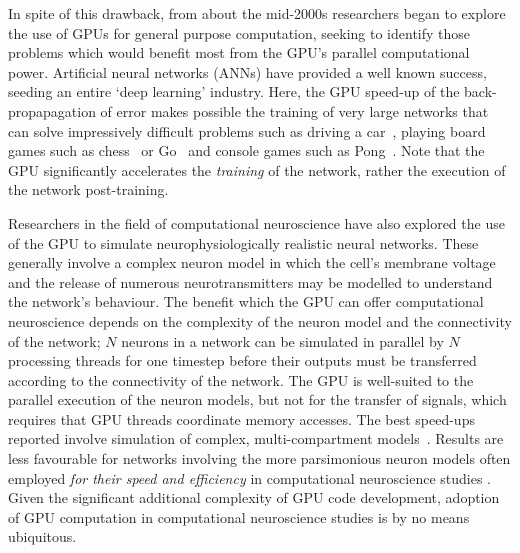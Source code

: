 \documentclass[11pt, a4paper]{article}
\begin{document}

In spite of this drawback, from about the mid-2000s researchers began to
explore the use of GPUs for general purpose computation, seeking to identify
those problems which would benefit most from the GPU's parallel computational
power.  Artificial neural networks (ANNs) have provided a well known success,
seeding an entire `deep learning' industry. Here, the GPU speed-up of the
back-propapagation of error makes possible the training of very large networks
that can solve impressively difficult problems such as driving a
car~\cite{bojarski_end_2016,bojarski_explaining_2017}, playing board games
such as chess~\cite{thrun_learning_1995,david_deepchess_2016} or Go~\cite{silver_general_2018} and console games such as
Pong~\cite{mnih_playing_2013}. Note that the GPU significantly accelerates
the \emph{training} of the network, rather the execution of the network
post-training.

Researchers in the field of computational neuroscience have also explored the
use of the GPU to simulate neurophysiologically realistic neural networks.
These generally involve a complex neuron model in which the cell's membrane
voltage and the release of numerous neurotransmitters may be modelled to
understand the network's behaviour. The benefit which the GPU can offer
computational neuroscience depends on the complexity of the neuron model and
the connectivity of the network; $N$ neurons in a network can be simulated in
parallel by $N$ processing threads for one timestep before their outputs must
be transferred according to the connectivity of the network. The GPU is
well-suited to the parallel execution of the neuron models, but not for the
transfer of signals, which requires that GPU threads coordinate memory
accesses. The best speed-ups reported involve simulation of complex,
multi-compartment models~\cite{stimberg_brian2genn_2020}. Results are less
favourable for networks involving the more parsimonious neuron models often
employed \emph{for their speed and efficiency} in computational neuroscience
studies \cite{nageswaran_configurable_2009}. Given the significant additional
complexity of GPU code development, adoption of GPU computation in
computational neuroscience studies is by no means ubiquitous.
\end{document}
